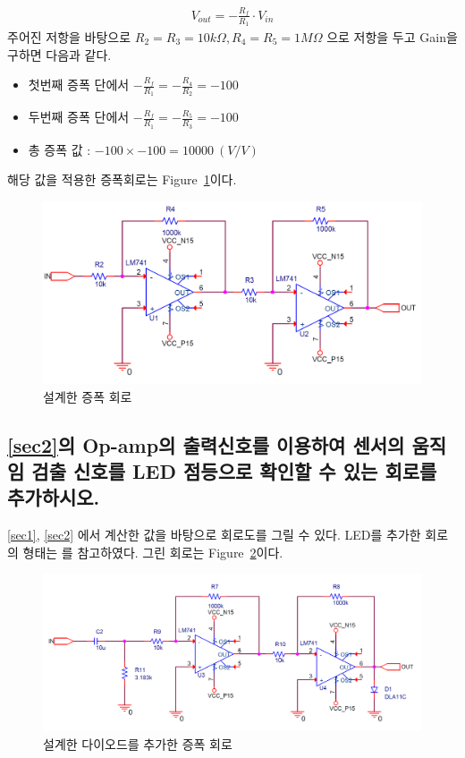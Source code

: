 \documentclass{article}
\begin{document}
\begin{align}
    V_{out} = -\frac{R_f}{R_1}\cdot V_{in}
\end{align}
주어진 저항을 바탕으로 $R_2 = R_3 = 10k\Omega, R_4 = R_5 = 1M\Omega$ 으로 저항을 두고 Gain을 구하면 다음과 같다.
\begin{itemize}
    \item 첫번째 증폭 단에서 $-\frac{R_f}{R_1} = -\frac{R_4}{R_2} = -100$
    \item 두번째 증폭 단에서 $-\frac{R_f}{R_1} = -\frac{R_5}{R_3} = -100$
    \item 총 증폭 값 : $-100\times-100 = 10000~(V/V)$
\end{itemize}
해당 값을 적용한 증폭회로는 Figure~\ref{fig2}이다.
\begin{figure}[H]
    \centering
    \includegraphics[width=0.7\linewidth]{figures/fig2.png}
    \caption{설계한 증폭 회로}
    \label{fig2}
\end{figure}

\subsection{\ref{sec2}의 Op-amp의 출력신호를 이용하여 센서의 움직임 검출 신호를 LED 점등으로 확인할 수 있는 회로를 추가하시오.}
\ref{sec1}, \ref{sec2} 에서 계산한 값을 바탕으로 회로도를 그릴 수 있다.
LED를 추가한 회로의 형태는 \cite{ele}를 참고하였다. 그린 회로는 Figure~\ref{fig3}이다.

\begin{figure}[H]
    \centering
    \includegraphics[width=0.7\linewidth]{figures/fig3.png}
    \caption{설계한 다이오드를 추가한 증폭 회로}
    \label{fig3}
\end{figure}




\end{document}
